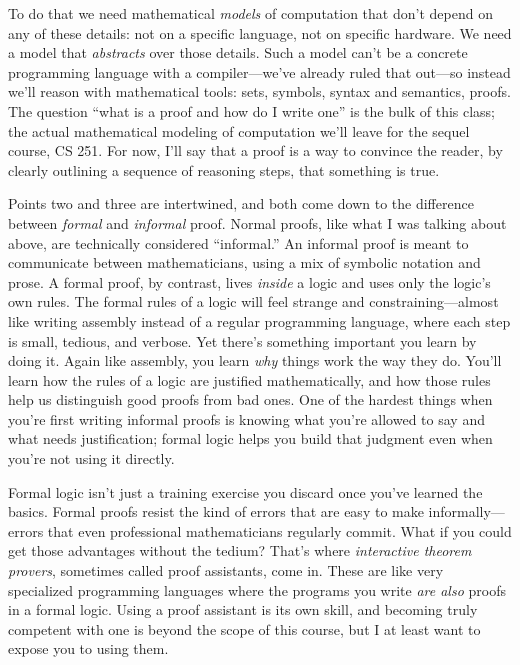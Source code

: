 \documentclass[11pt]{article}
\begin{document}
To do that we need mathematical \emph{models} of computation that don't depend on any of these details: not on a specific language, not on specific hardware. We need a model that \emph{abstracts} over those details. Such a model can't be a concrete programming language with a compiler---we've already ruled that out---so instead we'll reason with mathematical tools: sets, symbols, syntax and semantics, proofs. The question ``what is a proof and how do I write one'' is the bulk of this class; the actual mathematical modeling of computation we'll leave for the sequel course, CS 251. For now, I'll say that a proof is a way to convince the reader, by clearly outlining a sequence of reasoning steps, that something is true.

Points two and three are intertwined, and both come down to the difference between \emph{formal} and \emph{informal} proof. Normal proofs, like what I was talking about above, are technically considered ``informal.'' An informal proof is meant to communicate between mathematicians, using a mix of symbolic notation and prose. A formal proof, by contrast, lives \emph{inside} a logic and uses only the logic's own rules. The formal rules of a logic will feel strange and constraining---almost like writing assembly instead of a regular programming language, where each step is small, tedious, and verbose. Yet there's something important you learn by doing it. Again like assembly, you learn \emph{why} things work the way they do. You'll learn how the rules of a logic are justified mathematically, and how those rules help us distinguish good proofs from bad ones. One of the hardest things when you're first writing informal proofs is knowing what you're allowed to say and what needs justification; formal logic helps you build that judgment even when you're not using it directly.

Formal logic isn't just a training exercise you discard once you've learned the basics. Formal proofs resist the kind of errors that are easy to make informally---errors that even professional mathematicians regularly commit. What if you could get those advantages without the tedium? That's where \emph{interactive theorem provers}, sometimes called proof assistants, come in. These are like very specialized programming languages where the programs you write \emph{are also} proofs in a formal logic. Using a proof assistant is its own skill, and becoming truly competent with one is beyond the scope of this course, but I at least want to expose you to using them.
\end{document}
